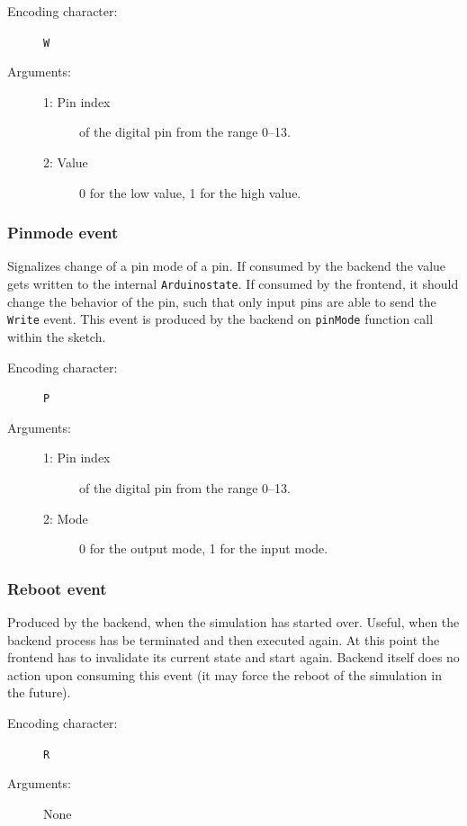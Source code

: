 \begin{description}
    \item[Encoding character:] \texttt{W}
    \item[Arguments:] \hfill
    \begin{description}
        \item[1: Pin index] of the digital pin from the range 0--13.
        \item[2: Value] 0 for the low value, 1 for the high value.
    \end{description}
\end{description}

\subsubsection{Pinmode event}
Signalizes change of a pin mode of a pin. If consumed by the backend the value gets written to the internal \texttt{Arduinostate}. If consumed by the frontend, it should change the behavior of the pin, such that only input pins are able to send the \texttt{Write} event. This event is produced by the backend on \texttt{pinMode} function call within the sketch.

\begin{description}
    \item[Encoding character:] \texttt{P}
    \item[Arguments:] \hfill
    \begin{description}
        \item[1: Pin index] of the digital pin from the range 0--13.
        \item[2: Mode] 0 for the output mode, 1 for the input mode.
    \end{description}
\end{description}

\subsubsection{Reboot event}
Produced by the backend, when the simulation has started over. Useful, when the backend process has be
terminated and then executed again. At this point the frontend has to invalidate its current state and start again. Backend itself does no action upon consuming this event (it may force the reboot of the simulation in the future).

\begin{description}
    \item[Encoding character:] \texttt{R}
    \item[Arguments:] None
\end{description}

